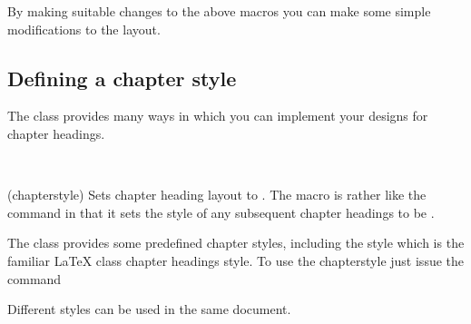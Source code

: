 By making suitable changes to the above macros you can make some
simple modifications to the layout.


\subsection{Defining a chapter style} \label{sec:chapterstyle}


    The class provides many ways in which you can implement your designs
for chapter headings.

\begin{syntax}
\cmd{\chapterstyle} \\
\end{syntax}
\glossary(chapterstyle)%
  {}%
  {Sets chapter heading layout to .}
The macro \cmd{\chapterstyle} is rather like the \cmd{\pagestyle} command in
that it sets the style of any subsequent chapter headings to be .

    The class provides some predefined chapter styles, including the
 style which is the familiar LaTeX  class chapter
headings style. To use the chapterstyle  just issue the command
\begin{lcode}
\end{lcode}
Different styles can be used in the same document.

